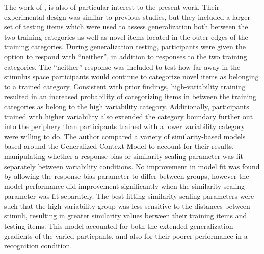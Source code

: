 \documentclass[
  12pt,
  letterpaper,
]{article}
\begin{document}
The work of \textcite{hahnEffectsCategoryDiversity2005}, is also of
particular interest to the present work. Their experimental design was
similar to previous studies, but they included a larger set of testing
items which were used to assess generalization both between the two
training categories as well as novel items located in the outer edges of
the training categories. During generalization testing, participants
were given the option to respond with ``neither'', in addition to
responses to the two training categories. The ``neither'' response was
included to test how far away in the stimulus space participants would
continue to categorize novel items as belonging to a trained category.
Consistent with prior findings, high-variability training resulted in an
increased probability of categorizing items in between the training
categories as belong to the high variability category. Additionally,
participants trained with higher variability also extended the category
boundary further out into the periphery than participants trained with a
lower variability category were willing to do. The author compared a
variety of similarity-based models based around the Generalized Context
Model
\autocite{nosofskyAttentionSimilarityIdentificationcategorization1986}
to account for their results, manipulating whether a response-bias or
similarity-scaling parameter was fit separately between variability
conditions. No improvement in model fit was found by allowing the
response-bias parameter to differ between groups, however the model
performance did improvement significantly when the similarity scaling
parameter was fit separately. The best fitting similarity-scaling
parameters were such that the high-variability group was less sensitive
to the distances between stimuli, resulting in greater similarity values
between their training items and testing items. This model accounted for
both the extended generalization gradients of the varied particpants,
and also for their poorer performance in a recognition condition.
\end{document}
